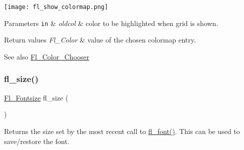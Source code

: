  
\begin{DoxyImage}
\texttt{[image: fl\_show\_colormap.png]}
\end{DoxyImage}
 
\begin{DoxyParams}[1]{Parameters}
\mbox{\tt in}  & {\em oldcol} & color to be highlighted when grid is shown. \\
\hline
\end{DoxyParams}

\begin{DoxyRetVals}{Return values}
{\em Fl\+\_\+\+Color} & value of the chosen colormap entry. \\
\hline
\end{DoxyRetVals}
\begin{DoxySeeAlso}{See also}
\hyperlink{class_fl___color___chooser}{Fl\+\_\+\+Color\+\_\+\+Chooser} 
\end{DoxySeeAlso}
\mbox{\label{group__fl__attributes_ga15b0cb282ba6d148f095647731f167b2}} 
\subsubsection{\texorpdfstring{fl\+\_\+size()}{fl\_size()}}
{\footnotesize\ttfamily \hyperlink{_enumerations_8_h_ad58927f5c691454480f7cd28362502f1}{Fl\+\_\+\+Fontsize} fl\+\_\+size (\begin{DoxyParamCaption}{ }\end{DoxyParamCaption})\hspace{0.3cm}{\ttfamily [inline]}}

Returns the {\ttfamily size} set by the most recent call to \hyperlink{group__fl__attributes_ga80203d2dd1e06550e7a35d6bb72f9bd6}{fl\+\_\+font()}. This can be used to save/restore the font. \mbox{\label{group__fl__attributes_ga14cb75a92b6cdd576f9512b38a208f8b}} 
